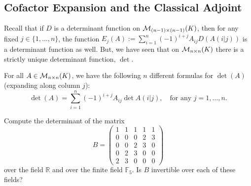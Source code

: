 \subsection{Cofactor Expansion and the Classical Adjoint}

Recall that if $D$ is a determinant function on $\mathcal{M}_{(n-1) \times (n-1)}(K)$, then for any fixed $j \in \{1, \dots, n\}$, the function $E_j(A) := \sum_{i=1}^n (-1)^{i+j} A_{ij} D(A(i|j))$ is a determinant function as well. But, we have seen that on $\mathcal{M}_{n \times n}(K)$ there is a strictly unique determinant function, $\det$.

\begin{corollary}
  \label{cor:cofactor_expansion}
  For all $A \in \mathcal{M}_{n \times n}(K)$, we have the following $n$ different formulas for $\det(A)$ (expanding along column $j$):
  \[
  \det(A) = \sum_{i=1}^n (-1)^{i+j} A_{ij} \det A(i|j), \quad \text{for any } j = 1, \dots, n.
  \]
\end{corollary}

\begin{exercise}
  \label{exc:determinant_5x5_laplace}
  Compute the determinant of the matrix
  \[
  B = \begin{pmatrix}
    1 & 1 & 1 & 1 & 1 \\
    0 & 0 & 0 & 2 & 3 \\
    0 & 0 & 2 & 3 & 0 \\
    0 & 2 & 3 & 0 & 0 \\
    2 & 3 & 0 & 0 & 0
  \end{pmatrix}
  \]
  over the field $\mathbb{R}$ and over the finite field $\mathbb{F}_5$. Is $B$ invertible over each of these fields?
\end{exercise}

